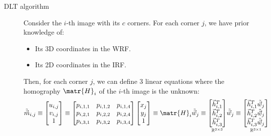 \begin{description}
        \begin{description}
            \item[DLT algorithm]
                Consider the $i$-th image with its $c$ corners.
                For each corner $j$, we have prior knowledge of:
                \begin{itemize}
                    \item Its 3D coordinates in the WRF.
                    \item Its 2D coordinates in the IRF.
                \end{itemize}
                Then, for each corner $j$, we can define 3 linear equations where the homography $\matr{H}_i$ of the $i$-th image is the unknown:
                \[ 
                    \tilde{\vec{m}}_{i,j} \equiv 
                        \begin{bmatrix} u_{i,j} \\ v_{i,j} \\ 1 \end{bmatrix} \equiv
                        \begin{bmatrix}
                            p_{i,1,1} & p_{i,1,2} & p_{i,1,4} \\
                            p_{i,2,1} & p_{i,2,2} & p_{i,2,4} \\
                            p_{i,3,1} & p_{i,3,2} & p_{i,3,4} \\
                        \end{bmatrix}
                        \begin{bmatrix} x_j \\ y_j \\ 1 \end{bmatrix} \equiv
                        \matr{H}_i \tilde{\vec{w}}_j \equiv
                        \underset{\mathbb{R}^{3 \times 3}}{\begin{bmatrix}
                            \vec{h}_{i, 1}^T \\ \vec{h}_{i, 2}^T \\ \vec{h}_{i, 3}^T
                        \end{bmatrix}}
                        \tilde{\vec{w}}_j \equiv
                        \underset{\mathbb{R}^{3 \times 1}}{\begin{bmatrix}
                            \vec{h}_{i, 1}^T \tilde{\vec{w}}_j \\ 
                            \vec{h}_{i, 2}^T \tilde{\vec{w}}_j \\ 
                            \vec{h}_{i, 3}^T \tilde{\vec{w}}_j

\end{bmatrix}}\]
\end{description}
\end{description}
